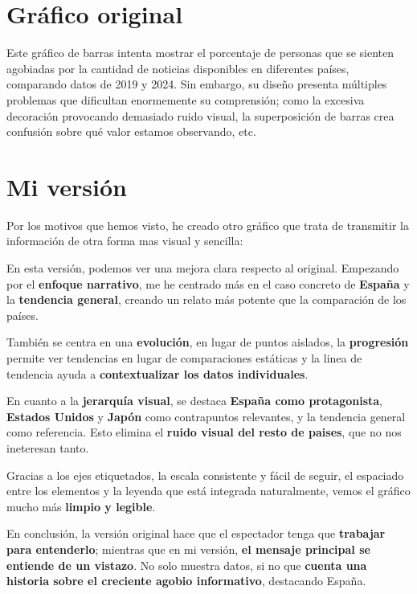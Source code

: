 \documentclass{../../../miPlantilla}
\begin{document}
\maketitle

\section{Gráfico original}


Este gráfico de barras intenta mostrar el porcentaje de personas que se sienten agobiadas por la cantidad de noticias disponibles
en diferentes países, comparando datos de 2019 y 2024. Sin embargo, su diseño presenta múltiples problemas que dificultan enormemente
su comprensión; como la excesiva decoración provocando demasiado ruido visual, la superposición de barras crea confusión sobre qué
valor estamos observando, etc.

\newpage

\section{Mi versión}
Por los motivos que hemos visto, he creado otro gráfico que trata de transmitir la información de otra forma mas visual y sencilla:


En esta versión, podemos ver una mejora clara respecto al original. Empezando por el \textbf{enfoque narrativo}, me he centrado más en el caso
concreto de \textbf{España} y la \textbf{tendencia general}, creando un relato más potente que la comparación de los países.

También se centra en una \textbf{evolución}, en lugar de puntos aislados, la \textbf{progresión} permite ver tendencias en lugar de comparaciones estáticas
y la linea de tendencia ayuda a \textbf{contextualizar los datos individuales}.

En cuanto a la \textbf{jerarquía visual}, se destaca \textbf{España como protagonista}, \textbf{Estados Unidos} y \textbf{Japón} como contrapuntos relevantes, y la tendencia
general como referencia. Esto elimina el \textbf{ruido visual del resto de paises}, que no nos ineteresan tanto.

Gracias a los ejes etiquetados, la escala consistente y fácil de seguir, el espaciado entre los elementos y la leyenda que está integrada
naturalmente, vemos el gráfico mucho más \textbf{limpio y legible}.

En conclusión, la versión original hace que el espectador tenga que \textbf{trabajar para entenderlo}; mientras que en mi versión, \textbf{el mensaje
principal se entiende de un vistazo}. No solo muestra datos, si no que \textbf{cuenta una historia sobre el creciente agobio informativo}, destacando
España. 
\end{document}
